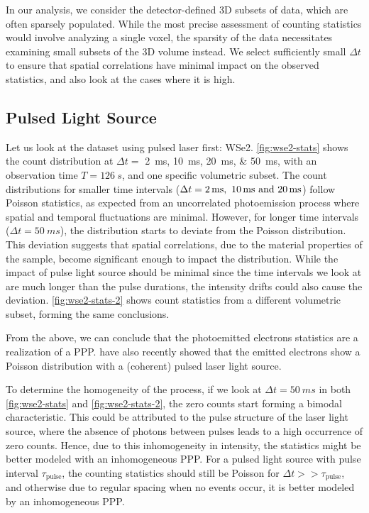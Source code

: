 In our analysis, we consider the detector-defined 3D subsets of data, which are often sparsely populated. While the most precise assessment of counting statistics would involve analyzing a single voxel, the sparsity of the data necessitates examining small subsets of the 3D volume instead. We select sufficiently small $\Delta t$ to ensure that spatial correlations have minimal impact on the observed statistics, and also look at the cases where it is high.

\subsection*{Pulsed Light Source}
Let us look at the dataset using pulsed laser first: \gls{WSe2}. \cref{fig:wse2-stats} shows the count distribution at $\Delta t =$ \qtylist{2;10;20;50}{ms}, with an observation time $T=\qty{126}{s}$, and one specific volumetric subset. The count distributions for smaller time intervals ($\Delta t = \qtylist{2;10;20}{ms}$) follow Poisson statistics, as expected from an uncorrelated photoemission process where spatial and temporal fluctuations are minimal. However, for longer time intervals ($\Delta t = \qty{50}{ms}$), the distribution starts to deviate from the Poisson distribution. This deviation suggests that spatial correlations, due to the material properties of the sample, become significant enough to impact the distribution. While the impact of pulse light source should be minimal since the time intervals we look at are much longer than the pulse durations, the intensity drifts could also cause the deviation. \cref{fig:wse2-stats-2} shows count statistics from a different volumetric subset, forming the same conclusions.

From the above, we can conclude that the photoemitted electrons statistics are a realization of a \gls{PPP}. \citeauthor{heimerlMultiphotonElectronEmission2024} \cite{heimerlMultiphotonElectronEmission2024} have also recently showed that the emitted electrons show a Poisson distribution with a (coherent) pulsed laser light source.

To determine the homogeneity of the process, if we look at $\Delta t = \qty{50}{ms}$ in both \cref{fig:wse2-stats} and \cref{fig:wse2-stats-2}, the zero counts start forming a bimodal characteristic. This could be attributed to the pulse structure of the laser light source, where the absence of photons between pulses leads to a high occurrence of zero counts. Hence, due to this inhomogeneity in intensity, the  statistics might be better modeled with an inhomogeneous \gls{PPP}. For a pulsed light source with pulse interval $\tau_{\text{pulse}}$, the counting statistics should still be Poisson for $\Delta t >> \tau_{\text{pulse}}$, and otherwise due to regular spacing when no events occur, it is better modeled by an inhomogeneous \gls{PPP}.


